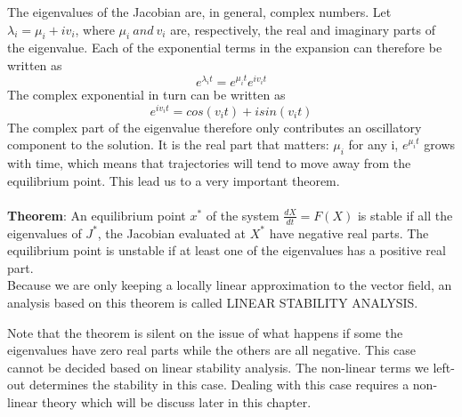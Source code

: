 \documentclass[a4paper,12pt]{report}
\numberwithin{equation}{section}
\begin{document}
The eigenvalues of the Jacobian are, in general, complex numbers. Let $\lambda_{i}=\mu _{i}+iv_{i}$, where $\mu _{i} \ and \ v_{i} $ are, respectively, the real and imaginary parts of the eigenvalue. Each of the exponential terms in the expansion can therefore be written as 
\begin{equation}
e^{\lambda _{i}t}=e^{\mu _{i}t}e^{iv_{i}t}
\end{equation}
The complex exponential in turn can be written as 
\begin{equation}
e^{iv_{i}t} = cos(v_{i}t)+isin(v_{i}t)
\end{equation}
The complex part of the eigenvalue therefore only contributes an oscillatory component to the solution. It is the real part that matters: $\mu_{i} $ for any i, $e^{\mu_{i}t} $ grows with time, which means that trajectories will tend to move away from the equilibrium point. This lead us to a very important theorem.\\ \\
\textbf{Theorem}: An equilibrium point $x^*$ of the system $\frac{dX}{dt}= F(X) $ is stable if all the eigenvalues of $ J^*$, the Jacobian evaluated  at $X^*$ have negative real parts. The equilibrium point is unstable if at least one of the eigenvalues has a positive real part.\\
Because we are only keeping a locally linear approximation to the vector field, an analysis based on this theorem is called LINEAR STABILITY ANALYSIS.

Note that the theorem is silent on the issue of what happens if some the eigenvalues have zero real parts while the others are all negative. This case cannot be decided based on linear stability analysis. The non-linear terms we left-out determines the stability in this case. Dealing with this case requires a non-linear theory which will be discuss later  in this chapter.
\end{document}

